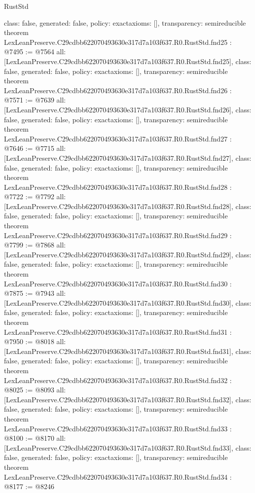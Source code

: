 \begin{lexlean}{RustStd}
\begin{coremodule}
{  class: false,
  generated: false,
  policy: exact{axioms: []},
  transparency: semireducible
}
theorem LexLeanPreserve.C29cdbb622070493630e317d7a103f637.R0.RustStd.fnd25 : @7495 := @7564 {
  all: [LexLeanPreserve.C29cdbb622070493630e317d7a103f637.R0.RustStd.fnd25],
  class: false,
  generated: false,
  policy: exact{axioms: []},
  transparency: semireducible
}
theorem LexLeanPreserve.C29cdbb622070493630e317d7a103f637.R0.RustStd.fnd26 : @7571 := @7639 {
  all: [LexLeanPreserve.C29cdbb622070493630e317d7a103f637.R0.RustStd.fnd26],
  class: false,
  generated: false,
  policy: exact{axioms: []},
  transparency: semireducible
}
theorem LexLeanPreserve.C29cdbb622070493630e317d7a103f637.R0.RustStd.fnd27 : @7646 := @7715 {
  all: [LexLeanPreserve.C29cdbb622070493630e317d7a103f637.R0.RustStd.fnd27],
  class: false,
  generated: false,
  policy: exact{axioms: []},
  transparency: semireducible
}
theorem LexLeanPreserve.C29cdbb622070493630e317d7a103f637.R0.RustStd.fnd28 : @7722 := @7792 {
  all: [LexLeanPreserve.C29cdbb622070493630e317d7a103f637.R0.RustStd.fnd28],
  class: false,
  generated: false,
  policy: exact{axioms: []},
  transparency: semireducible
}
theorem LexLeanPreserve.C29cdbb622070493630e317d7a103f637.R0.RustStd.fnd29 : @7799 := @7868 {
  all: [LexLeanPreserve.C29cdbb622070493630e317d7a103f637.R0.RustStd.fnd29],
  class: false,
  generated: false,
  policy: exact{axioms: []},
  transparency: semireducible
}
theorem LexLeanPreserve.C29cdbb622070493630e317d7a103f637.R0.RustStd.fnd30 : @7875 := @7943 {
  all: [LexLeanPreserve.C29cdbb622070493630e317d7a103f637.R0.RustStd.fnd30],
  class: false,
  generated: false,
  policy: exact{axioms: []},
  transparency: semireducible
}
theorem LexLeanPreserve.C29cdbb622070493630e317d7a103f637.R0.RustStd.fnd31 : @7950 := @8018 {
  all: [LexLeanPreserve.C29cdbb622070493630e317d7a103f637.R0.RustStd.fnd31],
  class: false,
  generated: false,
  policy: exact{axioms: []},
  transparency: semireducible
}
theorem LexLeanPreserve.C29cdbb622070493630e317d7a103f637.R0.RustStd.fnd32 : @8025 := @8093 {
  all: [LexLeanPreserve.C29cdbb622070493630e317d7a103f637.R0.RustStd.fnd32],
  class: false,
  generated: false,
  policy: exact{axioms: []},
  transparency: semireducible
}
theorem LexLeanPreserve.C29cdbb622070493630e317d7a103f637.R0.RustStd.fnd33 : @8100 := @8170 {
  all: [LexLeanPreserve.C29cdbb622070493630e317d7a103f637.R0.RustStd.fnd33],
  class: false,
  generated: false,
  policy: exact{axioms: []},
  transparency: semireducible
}
theorem LexLeanPreserve.C29cdbb622070493630e317d7a103f637.R0.RustStd.fnd34 : @8177 := @8246 {
}
\end{coremodule}
\end{lexlean}
